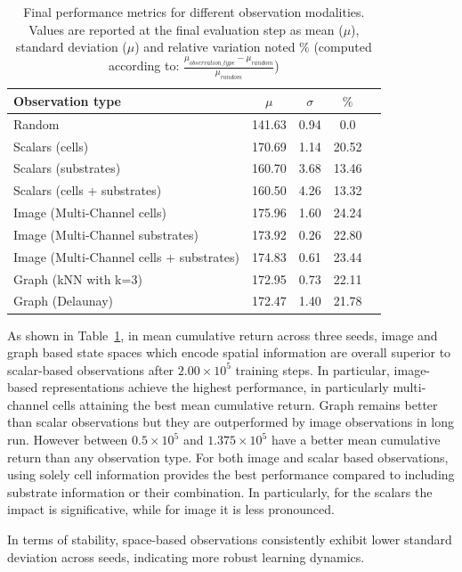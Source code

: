 \documentclass{article}
\begin{document}
\begin{table}[htbp]
\centering
\caption{Final performance metrics for different observation modalities. Values are reported at the final evaluation step as mean ($\mu$), standard deviation ($\mu$) and relative variation noted $\%$ (computed according to: $\frac{\mu_{observation\_type} - \mu_{random}}{\mu_{random}}$)}
\label{tab:obs_type_results}
\begin{tabular}{lcccc}
\hline
\textbf{Observation type} &
\textbf{$\mu$} &
\textbf{$\sigma$} &
\textbf{$\%$}\\
\hline
Random &
141.63 &
0.94 &
0.0 \\
\hline
Scalars (cells) &
170.69 &
1.14 &
20.52
\\
Scalars (substrates) &
160.70 &
3.68 &
13.46
\\
Scalars (cells + substrates) &
160.50 &
4.26  &
13.32 \\
\hline
Image (Multi-Channel cells) &
175.96 &
1.60 &
24.24\\
Image (Multi-Channel substrates) &
173.92 &
0.26 &
22.80
\\
Image (Multi-Channel cells + substrates) &
174.83 &
0.61 &
23.44 \\
\hline
Graph (kNN with k=3) &
172.95 &
0.73 &
22.11\\
Graph (Delaunay) &
172.47 &
1.40 &
21.78\\
\hline
\end{tabular}
\end{table}
As shown in Table~\ref{tab:obs_type_results}, in mean cumulative return across three seeds, image and graph based state spaces which encode spatial information are overall superior to scalar-based observations after $2.00 \times 10^{5}$ training steps. In particular, image-based representations achieve the highest performance, in particularly multi-channel cells attaining the best mean cumulative return.
Graph remains better than scalar observations but they are outperformed by image observations in long run. However between $0.5 \times 10^{5}$ and $1.375 \times 10^{5}$ have a better mean cumulative return than any observation type. 
For both image and scalar based observations, using solely cell information provides the best performance compared to including substrate information or their combination. In particularly, for the scalars the impact is significative, while for image it is less pronounced.

In terms of stability, space-based observations consistently exhibit lower standard deviation across seeds, indicating more robust learning dynamics. 
\end{document}
